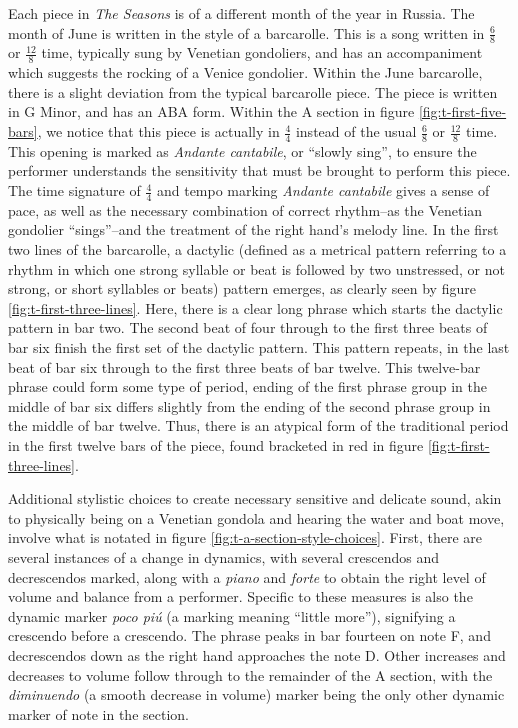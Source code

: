 Each piece in \textit{The Seasons} is of a different month of the year in Russia. The month of June is written in the style of a barcarolle. This is a song written in $\frac{6}{8}$ or $\frac{12}{8}$ time, typically sung by Venetian gondoliers, and has an accompaniment which suggests the rocking of a Venice gondolier\autocite{Latham_2011_barcarolle}. Within the June barcarolle, there is a slight deviation from the typical barcarolle piece. The piece is written in G Minor, and has an ABA form. Within the A section in figure \ref{fig:t-first-five-bars}, we notice that this piece is actually in $\frac{4}{4}$ instead of the usual $\frac{6}{8}$ or $\frac{12}{8}$ time. This opening is marked as \textit{Andante cantabile}, or ``slowly sing'', to ensure the performer understands the sensitivity that must be brought to perform this piece. The time signature of $\frac{4}{4}$ and tempo marking \textit{Andante cantabile} gives a sense of pace, as well as the necessary combination of correct rhythm--as the Venetian gondolier ``sings''--and the treatment of the right hand's melody line. In the first two lines of the barcarolle, a dactylic (defined as a metrical pattern referring to a rhythm in which one strong syllable or beat is followed by two unstressed, or not strong, or short syllables or beats)\autocite{dactylic} pattern emerges, as clearly seen by figure \ref{fig:t-first-three-lines}\autocite{Henle_2002}. Here, there is a clear long phrase which starts the dactylic pattern in bar two. The second beat of four through to the first three beats of bar six finish the first set of the dactylic pattern. This pattern repeats, in the last beat of bar six through to the first three beats of bar twelve. This twelve-bar phrase could form some type of period, ending of the first phrase group in the middle of bar six differs slightly from the ending of the second phrase group in the middle of bar twelve. Thus, there is an atypical form of the traditional period in the first twelve bars of the piece, found bracketed in red in figure \ref{fig:t-first-three-lines}\autocite{Henle_2002}. 

Additional stylistic choices to create necessary sensitive and delicate sound, akin to physically being on a Venetian gondola and hearing the water and boat move, involve what is notated in figure \ref{fig:t-a-section-style-choices}\autocite{Henle_2002}. First, there are several instances of a change in dynamics, with several crescendos and decrescendos marked, along with a \textit{piano} and \textit{forte} to obtain the right level of volume and balance from a performer. Specific to these measures is also the dynamic marker \textit{poco piú} (a marking meaning ``little more''), signifying a crescendo before a crescendo. The phrase peaks in bar fourteen on note F, and decrescendos down as the right hand approaches the note D. Other increases and decreases to volume follow through to the remainder of the A section, with the \textit{diminuendo} (a smooth decrease in volume) marker being the only other dynamic marker of note in the section.

